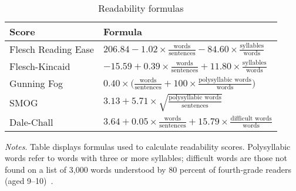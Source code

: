 \begin{table}
	\footnotesize
	\centering
	\begin{threeparttable}
		\caption{Readability formulas}
		\label{tab:formulas}
		\begin{tabular}{ll}
			\toprule
			Score&Formula\\
			\midrule
			Flesch Reading Ease&$206.84-1.02\times\frac{\text{words}}{\text{sentences}}-84.60\times\frac{\text{syllables}}{\text{words}}$\\
			Flesch-Kincaid&$-15.59+0.39\times\frac{\text{words}}{\text{sentences}}+11.80\times\frac{\text{syllables}}{\text{words}}$\\
			Gunning Fog&$0.40\times\big(\frac{\text{words}}{\text{sentences}}+100\times\frac{\text{polysyllabic words}}{\text{words}}\big)$\\
			SMOG&$3.13+5.71\times\sqrt{\frac{\text{polysyllabic words}}{\text{sentences}}}$\\
			Dale-Chall&$3.64+0.05\times\frac{\text{words}}{\text{sentences}}+15.79\times\frac{\text{difficult words}}{\text{words}}$\\
			\bottomrule
		\end{tabular}
		\begin{tablenotes}
			\tiny
			\item \textit{Notes}. Table displays formulas used to calculate readability scores. Polysyllabic words refer to words with three or more syllables; difficult words are those not found on a list of 3,000 words understood by 80 percent of fourth-grade readers (aged 9--10)~\citep{Chall1995}.
		\end{tablenotes}
	\end{threeparttable}
\end{table}